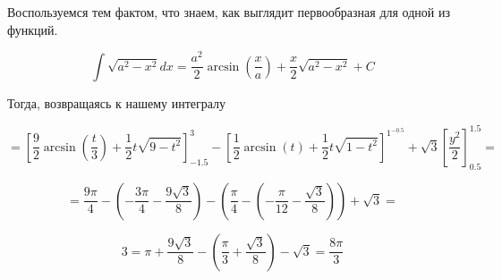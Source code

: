 Воспользуемся тем фактом, что знаем, как выглядит первообразная для одной из функций.

$$\int \sqrt{a^2 - x^2} dx = \frac{a^2}{2} \arcsin\left(\frac{x}{a}\right) + \frac{x}{2} \sqrt{a^2 - x^2} + C$$

Тогда, возвращаясь к нашему интегралу

$$= \left[ \frac{9}{2} \arcsin \left( \frac{t}{3} \right) + \frac{1}{2} t \sqrt{9 - t^2} \right]_{-1.5}^{3} - \left[ \frac{1}{2} \arcsin(t) + \frac{1}{2} t \sqrt{1 - t^2} \right]^{1^{-0.5}} + \sqrt{3} \left[ \frac{y^2}{2} \right]^{1.5}_{0.5} = $$

$$=\frac{9\pi}{4} - \left(-\frac{3\pi}{4} - \frac{9\sqrt{3}}{8}\right) - \left(\frac{\pi}{4} - \left( -\frac{\pi}{12} - \frac{\sqrt{3}}{8} \right) \right) +\sqrt{3} =$$

$$3=\pi + \frac{9\sqrt{3}}{8} - \left(\frac{\pi}{3} + \frac{\sqrt{3}}{8}\right) - \sqrt{3} = \boxed{\frac{8\pi}{3}}$$
